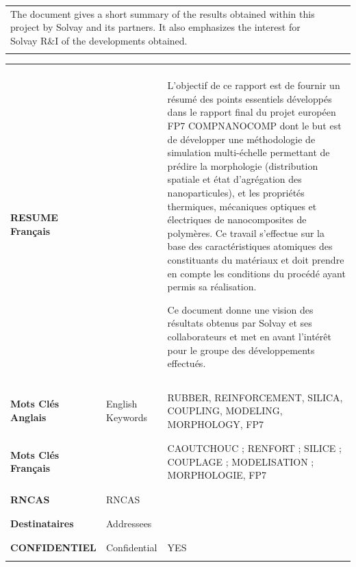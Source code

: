 \documentclass[10pt, letter]{report}
\renewcommand{\=}{\, =\, }
\newcommand{\+}{\, +\, }
\renewcommand{\-}{\, -\, }
\begin{document}
\begin{flushleft}
\begin{tabular}{|l|p{}|p{}|}
The document gives a short summary of the results obtained within this project by Solvay and its partners. It also emphasizes the interest for Solvay R$\&$I of  the developments obtained. 


\\
&&\\ 
\hline
\end{tabular}

\begin{tabular}{|l|p{}|p{}|}
\hline
&&\\
\bf RESUME Français &&  L'objectif de ce rapport est de fournir un résumé des points essentiels développés dans le rapport final du projet européen FP7 COMPNANOCOMP dont le but est de développer une méthodologie de simulation multi-échelle permettant de prédire la morphologie (distribution spatiale et état d'agrégation des nanoparticules), et les propriétés thermiques, mécaniques optiques et électriques de nanocomposites de polymères. Ce travail s'effectue sur la base des caractéristiques atomiques des constituants du matériaux et doit prendre en compte les conditions du procédé ayant permis sa réalisation.

Ce document donne une vision des résultats obtenus par Solvay et ses collaborateurs et met en avant l'intérêt pour le groupe des développements effectués.
\\
&&\\ \hline &&\\
\bf Mots Clés Anglais & English Keywords&  RUBBER, REINFORCEMENT, SILICA, COUPLING, MODELING, MORPHOLOGY, FP7\\
&&\\ \hline &&\\
\bf Mots Clés Français &&  CAOUTCHOUC ; RENFORT ; SILICE ; COUPLAGE ; MODELISATION ; MORPHOLOGIE, FP7\\
&&\\ \hline &&\\
\bf RNCAS & RNCAS & \\
&&\\ \hline &&\\
\bf Destinataires& Addressees & \\
&&\\ \hline &&\\
\bf CONFIDENTIEL & Confidential & YES \\
&&\\ \hline
\end{tabular}



\end{flushleft}
\end{document}
